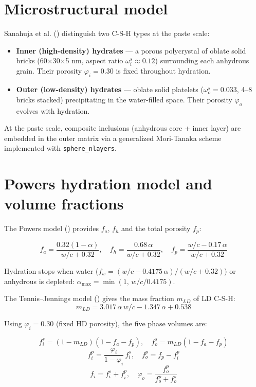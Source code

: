 \documentclass[
  a4paper,
  numbers=noendperiod,
  DIV=12]{scrreprt}
\providecommand{\tightlist}{%
  \setlength{\itemsep}{0pt}\setlength{\parskip}{0pt}}
\begin{document}
\section{Microstructural model}\label{sec-sanahuja-model}

Sanahuja et al. () distinguish two
C-S-H types at the paste scale:

\begin{itemize}
\tightlist
\item
  \textbf{Inner (high-density) hydrates} --- a porous polycrystal of
  oblate solid bricks (60×30×5 nm, aspect ratio
  \(\omega_i^s \approx 0.12\)) surrounding each anhydrous grain. Their
  porosity \(\varphi_i = 0.30\) is fixed throughout hydration.
\item
  \textbf{Outer (low-density) hydrates} --- oblate solid platelets
  (\(\omega_o^s = 0.033\), 4--8 bricks stacked) precipitating in the
  water-filled space. Their porosity \(\varphi_o\) evolves with
  hydration.
\end{itemize}

At the paste scale, composite inclusions (anhydrous core + inner layer)
are embedded in the outer matrix via a generalized Mori-Tanaka scheme
implemented with \texttt{sphere\_nlayers}.

\section{Powers hydration model and volume
fractions}\label{sec-sanahuja-vf}

The Powers model ()
provides \(f_a\), \(f_h\) and the total porosity \(f_p\):

\[
f_a = \frac{0.32(1-\alpha)}{w/c+0.32},\quad
f_h = \frac{0.68\,\alpha}{w/c+0.32},\quad
f_p = \frac{w/c-0.17\,\alpha}{w/c+0.32}
\]

Hydration stops when water (\(f_w = (w/c-0.4175\,\alpha)/(w/c+0.32)\))
or anhydrous is depleted: \(\alpha_{\max}=\min(1,\,w/c/0.4175)\).

The Tennis--Jennings model () gives the mass fraction \(m_{LD}\) of LD C-S-H: \[
m_{LD} = 3.017\,\alpha\,w/c - 1.347\,\alpha + 0.538
\]

Using \(\varphi_i = 0.30\) (fixed HD porosity), the five phase volumes
are:

\[
f_i^s = (1-m_{LD})(1-f_a-f_p),\quad
f_o^s = m_{LD}(1-f_a-f_p)
\] \[
f_i^p = \frac{\varphi_i}{1-\varphi_i}\,f_i^s,\quad
f_o^p = f_p - f_i^p
\] \[
f_i = f_i^s+f_i^p,\quad \varphi_o = \frac{f_o^p}{f_o^p+f_o^s}
\]
\end{document}
